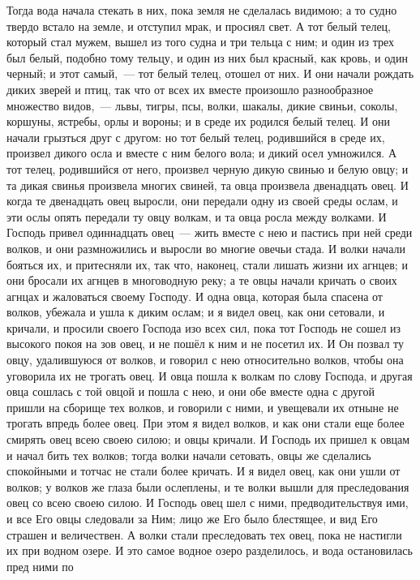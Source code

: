 Тогда вода начала стекать в них, пока земля не сделалась видимою; а то
судно твердо встало на земле, и отступил мрак, и просиял свет.
А тот белый телец, который стал мужем, вышел из того судна и три
тельца с ним; и один из трех был белый, подобно тому тельцу, и один из них был
красный, как кровь, и один черный; и этот самый,~--- тот белый телец, отошел от
них.
И они начали рождать диких зверей и птиц, так что от всех их вместе
произошло разнообразное множество видов,~--- львы, тигры, псы, волки, шакалы,
дикие свиньи, соколы, коршуны, ястребы, орлы и вороны; и в среде их родился
белый телец.
И они начали грызться друг с другом: но тот белый телец, родившийся в
среде их, произвел дикого осла и вместе с ним белого вола; и дикий осел
умножился.
А тот телец, родившийся от него, произвел черную дикую свинью и белую
овцу; и та дикая свинья произвела многих свиней, та овца произвела двенадцать
овец.
И когда те двенадцать овец выросли, они передали одну из своей среды
ослам, и эти ослы опять передали ту овцу волкам, и та овца росла между волками.
И Господь привел одиннадцать овец~--- жить вместе с нею и пастись при
ней среди волков, и они размножились и выросли во многие овечьи стада.
И волки начали бояться их, и притесняли их, так что, наконец, стали
лишать жизни их агнцев; и они бросали их агнцев в многоводную реку; а те овцы
начали кричать о своих агнцах и жаловаться своему Господу.
И одна овца, которая была спасена от волков, убежала и ушла к диким
ослам; и я видел овец, как они сетовали, и кричали, и просили своего Господа
изо всех сил, пока тот Господь не сошел из высокого покоя на зов овец, и не
пошёл к ним и не посетил их.
И Он позвал ту овцу, удалившуюся от волков, и говорил с нею
относительно волков, чтобы она уговорила их не трогать овец.
И овца пошла к волкам по слову Господа, и другая овца сошлась с той
овцой и пошла с нею, и они обе вместе одна с другой пришли на сборище тех
волков, и говорили с ними, и увещевали их отныне не трогать впредь более овец.
При этом я видел волков, и как они стали еще более смирять овец всею
своею силою; и овцы кричали.
И Господь их пришел к овцам и начал бить тех волков; тогда волки
начали сетовать, овцы же сделались спокойными и тотчас не стали более кричать.
И я видел овец, как они ушли от волков; у волков же глаза были
ослеплены, и те волки вышли для преследования овец со всею своею силою.
И Господь овец шел с ними, предводительствуя ими, и все Его овцы
следовали за Ним; лицо же Его было блестящее, и вид Его страшен и величествен.
А волки стали преследовать тех овец, пока не настигли их при водном
озере.
И это самое водное озеро разделилось, и вода остановилась пред ними по
